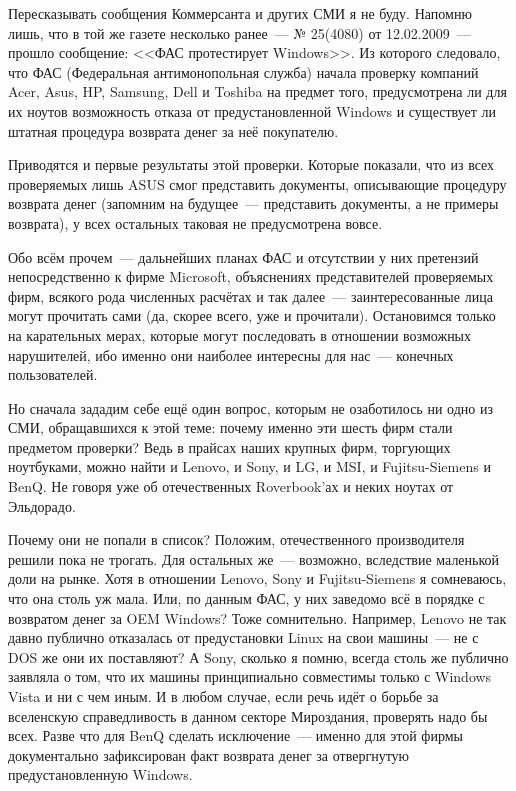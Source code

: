 Пересказывать сообщения Коммерсанта и других СМИ я не буду. Напомню лишь, что в той же газете несколько ранее~--- № 25(4080) от 12.02.2009~--- прошло сообщение: <<ФАС протестирует Windows>>. Из которого следовало, что ФАС (Федеральная антимонопольная служба) начала проверку компаний Acer, Asus, HP, Samsung, Dell и Toshiba на предмет того, предусмотрена ли для их ноутов возможность отказа от предустановленной Windows и существует ли штатная процедура возврата денег за неё покупателю.

Приводятся и первые результаты этой проверки. Которые показали, что из всех проверяемых лишь ASUS смог представить документы, описывающие процедуру возврата денег (запомним на будущее~--- представить документы, а не примеры возврата), у всех остальных таковая не предусмотрена вовсе.

Обо всём прочем~--- дальнейших планах ФАС и отсутствии у них претензий непосредственно к фирме Microsoft, объяснениях представителей проверяемых фирм, всякого рода численных расчётах и так далее~--- заинтересованные лица могут прочитать сами (да, скорее всего, уже и прочитали). Остановимся только на карательных мерах, которые могут последовать в отношении возможных нарушителей, ибо именно они наиболее интересны для нас~--- конечных пользователей.



Но сначала зададим себе ещё один вопрос, которым не озаботилось ни одно из СМИ, обращавшихся к этой теме: почему именно эти шесть фирм стали предметом проверки? Ведь в прайсах наших крупных фирм, торгующих ноутбуками, можно найти и Lenovo, и Sony, и LG, и MSI, и Fujitsu-Siemens и BenQ. Не говоря уже об отечественных Roverbook'ах и неких ноутах от Эльдорадо.

Почему они не попали в список? Положим, отечественного производителя решили пока не трогать. Для остальных же~--- возможно, вследствие маленькой доли на рынке. Хотя в отношении Lenovo, Sony и Fujitsu-Siemens я сомневаюсь, что она столь уж мала. Или, по данным ФАС, у них заведомо всё в порядке с возвратом денег за OEM Windows? Тоже сомнительно. Например, Lenovo не так давно публично отказалась от предустановки Linux на свои машины~--- не с DOS же они их поставляют? А Sony, сколько я помню, всегда столь же публично заявляла о том, что их машины принципиально совместимы только с Windows Vista и ни с чем иным. И в любом случае, если речь идёт о борьбе за вселенскую справедливость в данном секторе Мироздания, проверять надо бы всех. Разве что для BenQ сделать исключение~--- именно для этой фирмы документально зафиксирован факт возврата денег за отвергнутую предустановленную Windows.

